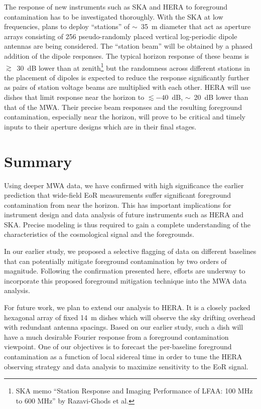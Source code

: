 \documentclass[preprint2,apjl,numberedappendix,twocolappendix,appendixfloats]{emulateapj}
\begin{document}
The response of new instruments such as SKA and HERA to foreground contamination has to be investigated thoroughly. With the SKA at low frequencies, plans to deploy ``stations'' of $\sim$~35~m diameter that act as aperture arrays consisting of 256 pseudo-randomly placed vertical log-periodic dipole antennas are being considered. The ``station beam'' will be obtained by a phased addition of the dipole responses. The typical horizon response of these beams is $\gtrsim$~30~dB lower than at zenith\footnote{SKA memo ``Station Response and Imaging Performance of LFAA: 100 MHz to 600 MHz'' by Razavi-Ghods et al.} but the randomness across different stations in the placement of dipoles is expected to reduce the response significantly further as pairs of station voltage beams are multiplied with each other. HERA will use dishes that limit response near the horizon to $\lesssim -40$~dB, $\sim$~20~dB lower than that of the MWA. Their precise beam responses and the resulting foreground contamination, especially near the horizon, will prove to be critical and timely inputs to their aperture designs which are in their final stages.

\section{Summary}\label{sec:summary}

Using deeper MWA data, we have confirmed with high significance the earlier prediction that wide-field EoR measurements suffer significant foreground contamination from near the horizon. This has important implications for instrument design and data analysis of future instruments such as HERA and SKA. Precise modeling is thus required to gain a complete understanding of the characteristics of the cosmological signal and the foregrounds. 

In our earlier study, we proposed a selective flagging of data on different baselines that can potentially mitigate foreground contamination by two orders of magnitude. Following the confirmation presented here, efforts are underway to incorporate this proposed foreground mitigation technique into the MWA data analysis.

For future work, we plan to extend our analysis to HERA. It is a closely packed hexagonal array of fixed 14~m dishes which will observe the sky drifting overhead with redundant antenna spacings. Based on our earlier study, such a dish will have a much desirable Fourier response from a foreground contamination viewpoint. One of our objectives is to forecast the per-baseline foreground contamination as a function of local sidereal time in order to tune the HERA observing strategy and data analysis to maximize sensitivity to the EoR signal.
\end{document}

